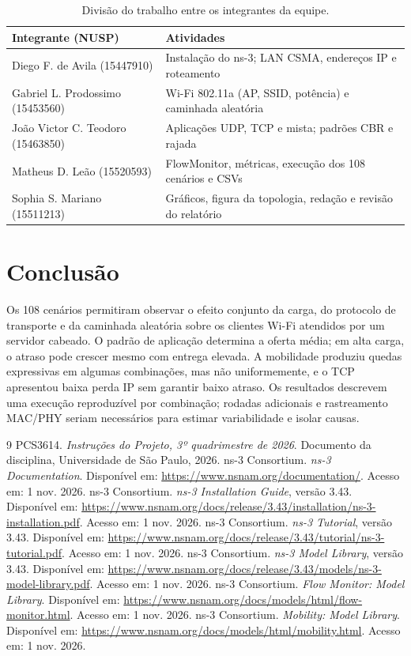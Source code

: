 \documentclass[12pt]{article}
\begin{document}
\begin{table}[ht]
\centering\small
\caption{Divisão do trabalho entre os integrantes da equipe.}
\label{tab:divisao}
\begin{tabular}{lp{}}
\toprule
Integrante (NUSP) & Atividades \\
\midrule
Diego F. de Avila (15447910) & Instalação do ns-3; LAN CSMA, endereços IP e roteamento \\
Gabriel L. Prodossimo (15453560) & Wi-Fi 802.11a (AP, SSID, potência) e caminhada aleatória \\
João Victor C. Teodoro (15463850) & Aplicações UDP, TCP e mista; padrões CBR e rajada \\
Matheus D. Leão (15520593) & FlowMonitor, métricas, execução dos 108 cenários e CSVs \\
Sophia S. Mariano (15511213) & Gráficos, figura da topologia, redação e revisão do relatório \\
\bottomrule
\end{tabular}
\end{table}

\section{Conclusão}
Os 108 cenários permitiram observar o efeito conjunto da carga, do protocolo
de transporte e da caminhada aleatória sobre os clientes Wi-Fi atendidos por
um servidor cabeado. O padrão de aplicação determina a oferta média; em alta
carga, o atraso pode crescer mesmo com entrega elevada. A mobilidade produziu
quedas expressivas em algumas combinações, mas não uniformemente, e o TCP
apresentou baixa perda IP sem garantir baixo atraso. Os resultados descrevem
uma execução reproduzível por combinação; rodadas adicionais e rastreamento
MAC/PHY seriam necessários para estimar variabilidade e isolar causas.

\begin{thebibliography}{9}
 PCS3614. \emph{Instruções do Projeto, 3º quadrimestre de 2026}.
Documento da disciplina, Universidade de São Paulo, 2026.
 ns-3 Consortium. \emph{ns-3 Documentation}. Disponível em:
\url{https://www.nsnam.org/documentation/}. Acesso em: 1 nov. 2026.
 ns-3 Consortium. \emph{ns-3 Installation Guide}, versão 3.43.
Disponível em: \url{https://www.nsnam.org/docs/release/3.43/installation/ns-3-installation.pdf}.
Acesso em: 1 nov. 2026.
 ns-3 Consortium. \emph{ns-3 Tutorial}, versão 3.43.
Disponível em: \url{https://www.nsnam.org/docs/release/3.43/tutorial/ns-3-tutorial.pdf}.
Acesso em: 1 nov. 2026.
 ns-3 Consortium. \emph{ns-3 Model Library}, versão 3.43.
Disponível em: \url{https://www.nsnam.org/docs/release/3.43/models/ns-3-model-library.pdf}.
Acesso em: 1 nov. 2026.
 ns-3 Consortium. \emph{Flow Monitor: Model Library}.
Disponível em: \url{https://www.nsnam.org/docs/models/html/flow-monitor.html}.
Acesso em: 1 nov. 2026.
 ns-3 Consortium. \emph{Mobility: Model Library}.
Disponível em: \url{https://www.nsnam.org/docs/models/html/mobility.html}.
Acesso em: 1 nov. 2026.
\end{thebibliography}
\end{document}
